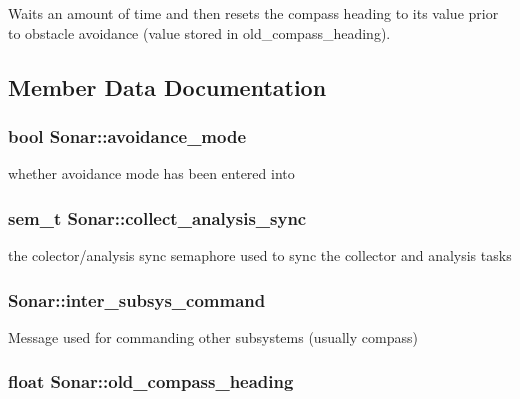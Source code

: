 Waits an amount of time and then resets the compass heading to its value prior to obstacle avoidance (value stored in old\-\_\-compass\-\_\-heading). 

\subsection{Member Data Documentation}
\hypertarget{classSonar_a72b11a8e569125119750ee9dd094141b}{
\subsubsection[{avoidance\-\_\-mode}]{\setlength{\rightskip}{0pt plus 5cm}bool Sonar\-::avoidance\-\_\-mode\hspace{0.3cm}{\ttfamily [protected]}}}\label{classSonar_a72b11a8e569125119750ee9dd094141b}
whether avoidance mode has been entered into \hypertarget{classSonar_a3dcf7c38af34539c68f123f073eb2f52}{
\subsubsection[{collect\-\_\-analysis\-\_\-sync}]{\setlength{\rightskip}{0pt plus 5cm}sem\-\_\-t Sonar\-::collect\-\_\-analysis\-\_\-sync\hspace{0.3cm}{\ttfamily [protected]}}}\label{classSonar_a3dcf7c38af34539c68f123f073eb2f52}
the colector/analysis sync semaphore used to sync the collector and analysis tasks \hypertarget{classSonar_a27d83a5a5c4859adb65641683e964018}{
\subsubsection[{inter\-\_\-subsys\-\_\-command}]{ Sonar\-::inter\-\_\-subsys\-\_\-command\hspace{0.3cm}{\ttfamily [protected]}}}\label{classSonar_a27d83a5a5c4859adb65641683e964018}
Message used for commanding other subsystems (usually compass) \hypertarget{classSonar_a223e1294a7e00208efcd2a80f57e7620}{
\subsubsection[{old\-\_\-compass\-\_\-heading}]{\setlength{\rightskip}{0pt plus 5cm}float Sonar\-::old\-\_\-compass\-\_\-heading\hspace{0.3cm}{\ttfamily [protected]}}}\label{classSonar_a223e1294a7e00208efcd2a80f57e7620}
